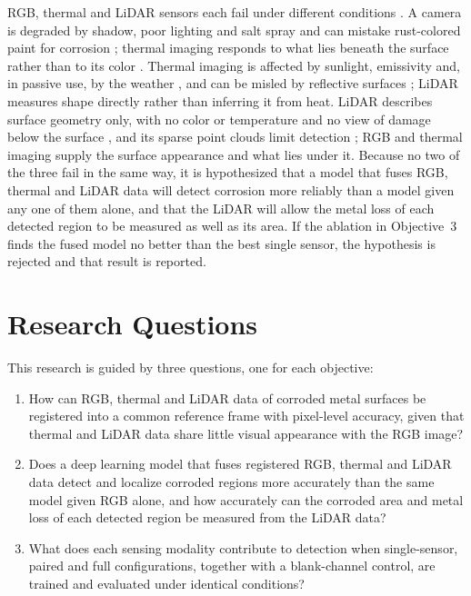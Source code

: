 RGB, thermal and LiDAR sensors each fail under different conditions
\citep{Tran2024}. A camera is degraded by shadow, poor lighting and salt spray
\citep{Soares2023,Mao2026,Espinoza2026} and can mistake rust-colored paint
for corrosion \citep{Espinoza2026,Lavadiya2022}; thermal imaging responds to
what lies beneath the surface rather than to its color
\citep{Elizalde2023,Doshvarpassand2022,Hernndez-Surez2026}. Thermal imaging is
affected by sunlight, emissivity and, in passive use, by the weather
\citep{Elizalde2023,Egodawela2025}, and can be misled by reflective surfaces
\citep{Tran2024}; LiDAR measures shape directly rather than inferring it from
heat. LiDAR describes surface geometry only, with no color or temperature and no
view of damage below the surface \citep{Ding2025}, and its sparse point clouds limit
detection \citep{Tran2024}; RGB and thermal imaging supply the surface
appearance and what lies under it. Because no two of the three fail in the
same way, it is hypothesized that a model that fuses RGB, thermal and LiDAR
data will detect corrosion more reliably than a model given any one of them
alone, and that the LiDAR will allow the metal loss of each detected region to
be measured as well as its area. If the ablation in Objective~3 finds the
fused model no better than the best single sensor, the hypothesis is rejected
and that result is reported.

\section{Research Questions}
\label{sec:research-questions}

This research is guided by three questions, one for each objective:

\begin{enumerate}[label=RQ\arabic*.,leftmargin=*,itemsep=8pt]
  \item How can RGB, thermal and LiDAR data of corroded metal surfaces be
        registered into a common reference frame with pixel-level accuracy,
        given that thermal and LiDAR data share little visual appearance with
        the RGB image?
  \item Does a deep learning model that fuses registered RGB, thermal and
        LiDAR data detect and localize corroded regions more accurately than
        the same model given RGB alone, and how accurately can the corroded
        area and metal loss of each detected region be measured from the LiDAR
        data?
  \item What does each sensing modality contribute to detection when
        single-sensor, paired and full configurations, together with a
        blank-channel control, are trained and evaluated under identical
        conditions?
\end{enumerate}

